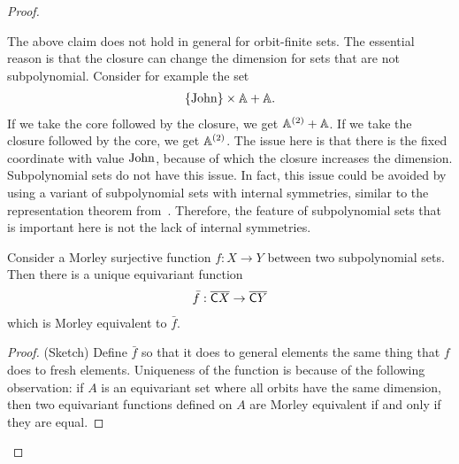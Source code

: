 \begin{proof}
    \begin{myexample}
            The above claim does not hold in general for orbit-finite sets.  The essential reason is that the closure can change the dimension for sets that are not subpolynomial. Consider for example the set 
            \begin{align*}
            \{\mathrm{John}\} \times \mathbb A + \mathbb A.
            \end{align*}
            If we take the core followed by the closure, we get $\mathbb A^{(2)} + \mathbb A$. If we take the closure followed by the core, we get $\mathbb A^{(2)}$.  The issue here is that there is the fixed coordinate with value $\mathrm{John}$, because of which the closure increases the dimension.  Subpolynomial sets do not have this issue. In fact,  this issue could be avoided by using a variant of subpolynomial sets with internal symmetries, similar to the representation theorem from~\cite[Theorem 4.18]{bojanczyk_slightly2018}. Therefore, the feature of subpolynomial sets that is important here is not the lack of internal symmetries. 
    \end{myexample}

    \begin{claim}\label{claim:equivariant-version}
        Consider a Morley surjective function $f : X \to Y$ between two subpolynomial sets. Then there is a unique equivariant function
        \begin{align*}
        \bar f : \overline{ \mathsf C X} \to \overline{ \mathsf C Y}
        \end{align*}
         which is  Morley equivalent to $\bar f$.
    \end{claim}
    \begin{proof}(Sketch)
        Define $\bar f$ so that it does to general elements the same thing that $f$ does to fresh elements.  Uniqueness of the function is because of the following observation: if $A$ is an equivariant set where all orbits have the same dimension, then two equivariant functions defined on $A$ are Morley equivalent if and only if they are equal.
    \end{proof}


\end{proof}
